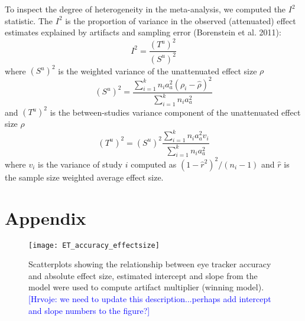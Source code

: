 \documentclass{article}
\newcommand{\hs}[1]{\textcolor{Blue}{[Hrvoje: #1]}}
\begin{document}
To inspect the degree of heterogeneity in the meta-analysis, we computed the $I^2$ statistic. The $I^2$ is the proportion of variance in the observed (attenuated) effect estimates explained by artifacts and sampling error (Borenstein et al. 2011): 
%
\begin{equation}
\label{eq:i2_statistic}
I^2 = \frac{(T^u)^2}{(S^u)^2}
\end{equation}
%
where $(S^u)^2$ is the weighted variance of the unattenuated effect size $\rho$
%
\begin{equation}
\label{eq:Su2_var}
(S^u)^2 = \frac{\sum_{i=1}^k n_i a_a^2 (\rho_i - \hat{\rho})^2}{\sum_{i=1}^k n_i a_a^2}
\end{equation}
%
and $(T^u)^2$ is the between-studies variance component of the unattenuated effect size $\rho$
%
\begin{equation}
\label{eq:Tu2_var}
(T^u)^2 = (S^u)^2 \frac{\sum_{i=1}^k n_i a_a^2 v_i}{\sum_{i=1}^k n_i a_a^2}
\end{equation}
%
where $v_i$ is the variance of study $i$ computed as $(1 - \hat{r}^2)^2 / (n_i - 1)$ and $\hat{r}$ is the sample size weighted average effect size.










\section{Appendix}
\label{appendix}
\FloatBarrier


\begin{figure}
\texttt{[image: ET\_accuracy\_effectsize]}
\centering
\caption{Scatterplots showing the relationship between eye tracker accuracy and absolute effect size, estimated intercept and slope from the model were used to compute artifact multiplier (winning model).\hs{we need to update this description...perhaps add intercept and slope numbers to the figure?}}
\label{fig:ET_accuracy_effectsize}
\end{figure}
\clearpage



\clearpage
\end{document}
